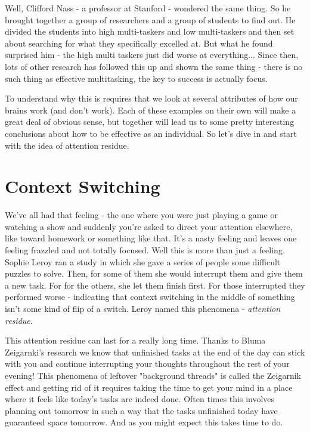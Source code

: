\documentclass[11pt]{book}
\begin{document}
Well, Clifford Nass - a professor at Stanford - wondered the same thing. So he brought together a group of researchers and a group of students to find out. He divided the students into high multi-taskers and low multi-taskers and then set about searching for what they specifically excelled at. But what he found surprised him - the high multi taskers just did worse at everything... Since then, lots of other research has followed this up and shown the same thing - there is no such thing as effective multitasking, the key to success is actually focus. \cite{keller}
\newline

To understand why this is requires that we look at several attributes of how our brains work (and don't work). Each of these examples on their own will make a great deal of obvious sense, but together will lead us to some pretty interesting conclusions about how to be effective as an individual. So let's dive in and start with the idea of attention residue.

\section{Context Switching}

We've all had that feeling - the one where you were just playing a game or watching a show and suddenly you're asked to direct your attention elsewhere, like toward homework or something like that. It's a nasty feeling and leaves one feeling frazzled and not totally focused. Well this is more than just a feeling. Sophie Leroy ran a study in which she gave a series of people some difficult puzzles to solve. Then, for some of them she would interrupt them and give them a new task. For for the others, she let them finish first. For those interrupted they performed worse - indicating that context switching in the middle of something isn't some kind of flip of a switch. Leroy named this phenomena - \textit{attention residue}. 
\newline

This attention residue can last for a really long time. Thanks to Bluma Zeigarnki's research we know that unfinished tasks at the end of the day can stick with you and continue interrupting your thoughts throughout the rest of your evening! This phenomena of leftover "background threads" is called the Zeigarnik effect \cite{newport} and getting rid of it requires taking the time to get your mind in a place where it feels like today's tasks are indeed done. Often times this involves planning out tomorrow in such a way that the tasks unfinished today have guaranteed space tomorrow. And as you might expect this takes time to do. 
\newline
\end{document}
